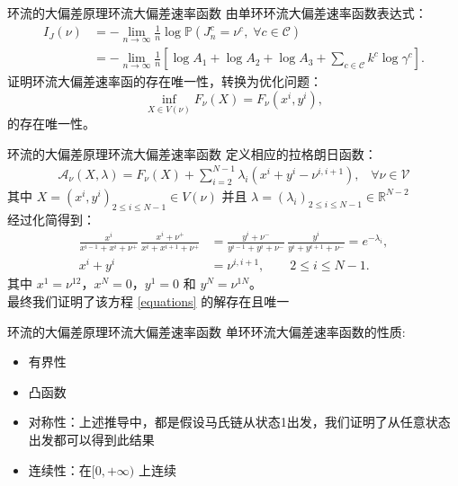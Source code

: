 \documentclass{beamer}
\begin{document}
\begin{frame}{环流的大偏差原理}{环流大偏差速率函数}
	由单环环流大偏差速率函数表达式：
	\begin{equation*}
		\begin{split}
			I_J(\nu) &= -\lim_{n\to\infty}\frac{1}{n}\log\mathbb{P}\left(J^c_n=\nu^c,\;\forall c\in\mathcal{C}\right)\\
			&= -\lim_{n\to\infty}\frac{1}{n}\left[\log A_1+\log A_2+\log A_3+\sum_{c\in\mathcal{C}}k^c\log\gamma^c\right].
		\end{split}
	\end{equation*}
	证明环流大偏差速率函的存在唯一性，转换为优化问题：
	\begin{equation*}
		\inf_{X\in V(\nu)}F_{\nu}(X) = F_{\nu}(x^i,y^i),
	\end{equation*}
	的存在唯一性。
\end{frame}

\begin{frame}{环流的大偏差原理}{环流大偏差速率函数}
	定义相应的拉格朗日函数：
	\begin{align*}
		\mathcal{A}_{\nu}(X,\lambda) = F_{\nu}(X) + \sum_{i=2}^{N-1} \lambda_i \left(x^{i} + y^{i} - \nu^{i,i+1}\right), \;\;\;\forall \nu\in\mathcal{V}
	\end{align*}
	其中 $X=(x^i,y^i)_{2\le i\le N-1}\in V(\nu)$ 并且 $\lambda=(\lambda_i)_{2\le i\le N-1}\in \mathbb{R}^{N-2}$ \\
	经过化简得到：
	\begin{equation}\label{equations}
		\begin{split}
			\frac{x^{i}}{x^{i-1}+x^{i}+\nu^+}
			\,\frac{x^{i}+\nu^+}{x^{i}+x^{i+1}+\nu^+}
			&= \frac{y^{i}+\nu^-}{y^{i-1}+y^{i}+\nu^-}
			\,\frac{y^{i}}{y^{i}+y^{i+1}+\nu^-}=e^{-\lambda_i},\\
			x^{i} + y^{i} &= \nu^{i,i+1},\qquad 2\le i\le N-1.
		\end{split}
	\end{equation}
	其中 $x^1=\nu^{12}$，$x^N=0$，$y^1=0$ 和 $y^N=\nu^{1N}$。\\
	最终我们证明了该方程 \ref{equations} 的解存在且唯一
\end{frame}

\begin{frame}{环流的大偏差原理}{环流大偏差速率函数}
	单环环流大偏差速率函数的性质:
	\begin{itemize}
		\item 有界性
		\item 凸函数
		\item 对称性：上述推导中，都是假设马氏链从状态1出发，我们证明了从任意状态出发都可以得到此结果
		\item 连续性：在$[0, +\infty)$ 上连续
	\end{itemize}
\end{frame}
\end{document}
